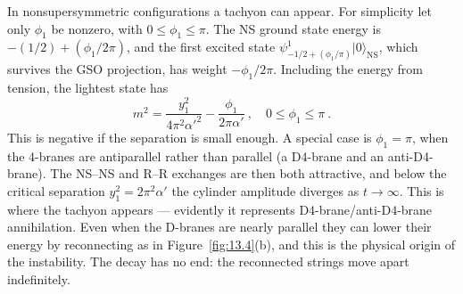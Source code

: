 In nonsupersymmetric configurations a tachyon can appear. For simplicity let only $\phi_1$ be nonzero, with $0 \le \phi_1 \le \pi$. The NS ground state energy is $-(1/2) + (\phi_1/2\pi)$, and the first excited state $\psi_{-1/2+(\phi_1/\pi)}^1\lvert 0\rangle_{\mathrm{NS}}$, which survives the GSO projection, has weight $-\phi_1/2\pi$. Including the energy from tension, the lightest state has
\begin{equation}
	m^2 = \frac{y_1^2}{4\pi^2{\alpha'}^2} - \frac{\phi_1}{2\pi\alpha'} \:, \quad 0 \le \phi_1 \le \pi \:. \label{13.4.27}
\end{equation}
This is negative if the separation is small enough. A special case is $\phi_1 = \pi$, when the 4-branes are antiparallel rather than parallel (a D4-brane and an anti-D4-brane). The NS--NS and R--R exchanges are then both attractive, and below the critical separation $y_1^2 = 2\pi^2\alpha'$ the cylinder amplitude diverges as $t \to \infty$. This is where the tachyon appears --- evidently it represents D4-brane/anti-D4-brane annihilation. Even when the D-branes are nearly parallel they can lower their energy by reconnecting as in Figure~\ref{fig:13.4}(b), and this is the physical origin of the instability. The decay has no end: the reconnected strings move apart indefinitely.
